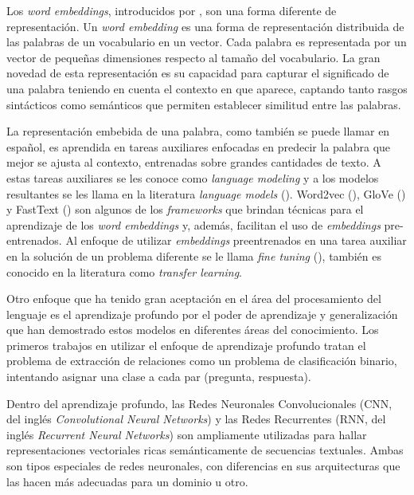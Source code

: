 Los \textit{word embeddings}, introducidos por \cite{mikolov-2013-word2vec}, son una forma diferente de representación. Un \textit{word embedding} es una forma de representación distribuida de las palabras de un vocabulario en un vector. Cada palabra es representada por un vector de pequeñas dimensiones respecto al tamaño del vocabulario. La gran novedad de esta representación es su capacidad para capturar el significado de una palabra teniendo en cuenta el contexto en que aparece, captando tanto rasgos sintácticos como semánticos que permiten establecer similitud entre las palabras.

La representación embebida de una palabra, como también se puede llamar en español, es aprendida en tareas auxiliares enfocadas en predecir la palabra que mejor se ajusta al contexto, entrenadas sobre grandes cantidades de texto. A estas tareas auxiliares se les conoce como \textit{language modeling} y a los modelos resultantes se les llama en la literatura \textit{language models} (\cite{rao-2019-nlpPython}). Word2vec (\cite{mikolov-2013-word2vec}), GloVe (\cite{pennington-2014-glove}) y FastText (\cite{mikolov-2016-fastext}) son algunos de los \textit{frameworks} que brindan técnicas para el aprendizaje de los \textit{word embeddings} y, además, facilitan el uso de \textit{embeddings} pre-entrenados. Al enfoque de utilizar \textit{embeddings} preentrenados en una tarea auxiliar en la solución de un problema diferente se le llama \textit{fine tuning} (\cite{rao-2019-nlpPython}), también es conocido en la literatura como \textit{transfer learning}.

Otro enfoque que ha tenido gran aceptación en el área del procesamiento del lenguaje es el aprendizaje profundo por el poder de aprendizaje y generalización que han demostrado estos modelos en diferentes áreas del conocimiento. Los primeros trabajos en utilizar el enfoque de aprendizaje profundo tratan el problema de extracción de relaciones como un problema de clasificación binario, intentando asignar una clase a cada par (pregunta, respuesta).

Dentro del aprendizaje profundo, las Redes Neuronales Convolucionales (CNN, del inglés \textit{Convolutional Neural Networks}) y las Redes Recurrentes (RNN, del inglés \textit{Recurrent Neural Networks}) son ampliamente utilizadas para hallar representaciones vectoriales ricas semánticamente de secuencias textuales. Ambas son tipos especiales de redes neuronales, con diferencias en sus arquitecturas que las hacen más adecuadas para un dominio u otro.


